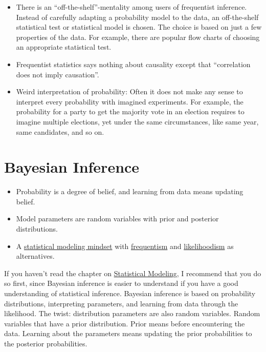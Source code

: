 \documentclass[
  10pt,
]{scrbook}
\providecommand{\tightlist}{%
  \setlength{\itemsep}{0pt}\setlength{\parskip}{0pt}}
\begin{document}
\begin{itemize}
\item
  There is an ``off-the-shelf''-mentality among users of frequentist inference. Instead of carefully adapting a probability model to the data, an off-the-shelf statistical test or statistical model is chosen. The choice is based on just a few properties of the data. For example, there are popular flow charts of choosing an appropriate statistical test.
\item
  Frequentist statistics says nothing about causality except that ``correlation does not imply causation''.
\item
  Weird interpretation of probability: Often it does not make any sense to interpret every probability with imagined experiments. For example, the probability for a party to get the majority vote in an election requires to imagine multiple elections, yet under the same circumstances, like same year, same candidates, and so on.
\end{itemize}

\hypertarget{bayesian-inference}{%
\chapter{Bayesian Inference}\label{bayesian-inference}}

\begin{itemize}
\tightlist
\item
  Probability is a degree of belief, and learning from data means updating belief.
\item
  Model parameters are random variables with prior and posterior distributions.
\item
  A \protect\hyperlink{statistical-modeling}{statistical modeling mindset} with \protect\hyperlink{frequentist-inference}{frequentism} and \protect\hyperlink{likelihoodism}{likelihoodism} as alternatives.
\end{itemize}

If you haven't read the chapter on \protect\hyperlink{statistical-modeling}{Statistical Modeling}, I recommend that you do so first, since Bayesian inference is easier to understand if you have a good understanding of statistical inference.
Bayesian inference is based on probability distributions, interpreting parameters, and learning from data through the likelihood.
The twist: distribution parameters are also random variables.
Random variables that have a prior distribution.
Prior means before encountering the data.
Learning about the parameters means updating the prior probabilities to the posterior probabilities.
\end{document}
